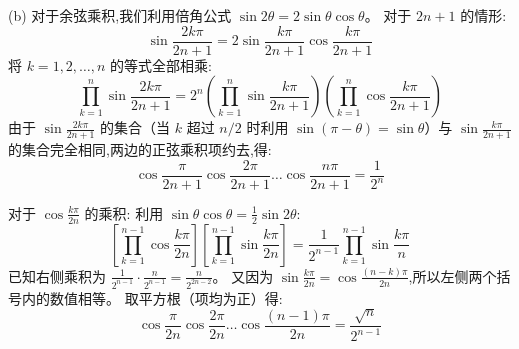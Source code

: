 \begin{questions}
\begin{solution}
    (b) 对于余弦乘积,我们利用倍角公式 $\sin 2\theta = 2 \sin \theta \cos \theta$。
    对于 $2n+1$ 的情形:
    \[ \sin \frac{2k\pi}{2n + 1} = 2 \sin \frac{k\pi}{2n + 1} \cos \frac{k\pi}{2n + 1} \]
    将 $k=1, 2, \dots, n$ 的等式全部相乘:
    \[ \prod_{k=1}^{n} \sin \frac{2k\pi}{2n+1} = 2^n \left( \prod_{k=1}^{n} \sin \frac{k\pi}{2n+1} \right) \left( \prod_{k=1}^{n} \cos \frac{k\pi}{2n+1} \right) \]
    由于 $\sin \frac{2k\pi}{2n+1}$ 的集合（当 $k$ 超过 $n/2$ 时利用 $\sin(\pi-\theta)=\sin\theta$）与 $\sin \frac{k\pi}{2n+1}$ 的集合完全相同,两边的正弦乘积项约去,得:
    \[ \cos \frac{\pi}{2n + 1} \cos \frac{2\pi}{2n + 1} \dots \cos \frac{n\pi}{2n + 1} = \frac{1}{2^n} \]

    对于 $\cos \frac{k\pi}{2n}$ 的乘积:
    利用 $\sin \theta \cos \theta = \frac{1}{2} \sin 2\theta$:
    \[ \left[ \prod_{k=1}^{n-1} \cos \frac{k\pi}{2n} \right] \left[ \prod_{k=1}^{n-1} \sin \frac{k\pi}{2n} \right] = \frac{1}{2^{n-1}} \prod_{k=1}^{n-1} \sin \frac{k\pi}{n} \]
    已知右侧乘积为 $\frac{1}{2^{n-1}} \cdot \frac{n}{2^{n-1}} = \frac{n}{2^{2n-2}}$。
    又因为 $\sin \frac{k\pi}{2n} = \cos \frac{(n-k)\pi}{2n}$,所以左侧两个括号内的数值相等。
    取平方根（项均为正）得:
    \[ \cos \frac{\pi}{2n} \cos \frac{2\pi}{2n} \dots \cos \frac{(n - 1)\pi}{2n} = \frac{\sqrt{n}}{2^{n-1}} \]


\end{solution}
\end{questions}
